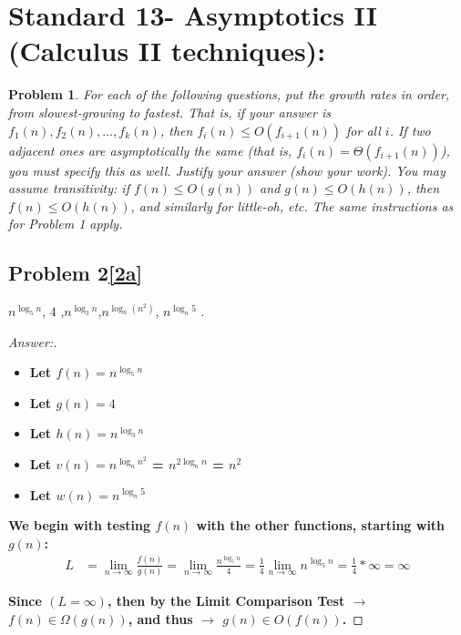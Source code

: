\documentclass[11pt]{article}
\theoremstyle{definition}
\theoremstyle{definition}
\newtheorem{required}{Problem}
\theoremstyle{definition}
\begin{document}
\section{Standard 13- Asymptotics II (Calculus II techniques): }
\begin{required}



    {\itshape For each of the following questions, put the growth rates in order, from slowest-growing to fastest. That is, if your answer is $f_1(n), f_2(n), \dotsc, f_k(n)$, then $f_i(n) \leq O(f_{i+1}(n))$ for all $i$. If two adjacent ones are asymptotically the same (that is, $f_i(n) = \Theta(f_{i+1}(n))$), you must specify this as well. 
    Justify your answer (show your work). You may assume transitivity: if $f(n) \leq O(g(n))$ and $g(n) \leq O(h(n))$, then $f(n) \leq O(h(n))$, and similarly for little-oh, etc. The same instructions as for Problem 1 apply.}
    \begin{enumerate}[label=(\alph*)]
\subsection{Problem 2\ref{2a}}
        \item \label{2a} $n^{\log_5 n}$, \qquad $4$ ,\qquad $n^{\log_3 n}$,\qquad  $n^{\log_n(n^2)}$, \qquad $ n^{\log_n 5}$ .
        \begin{proof}[Answer:] \

\begin{itemize}
\item \textbf{Let $f(n) = n^{\log_5 n}$}
\item \textbf{Let $g(n) = 4$}
\item \textbf{Let $h(n) = n^{\log_3 n}$}
\item \textbf{Let $v(n) = n^{\log_n n^2}$ = $n^{2\log_n n}$ = $n^2$}
\item \textbf{Let $w(n) = n^{\log_n 5}$}
\end{itemize}

\item \textbf{We begin with testing $f(n)$ with the other functions, starting with $g(n)$:}
\begin{align*}
L &= \lim_{n \to \infty} \frac{f(n)}{g(n)} = \lim_{n \to \infty} \frac{n^{\log_5 n}}{4} = \frac{1}{4} \lim_{n \to \infty} n^{\log_5 n} =  \frac{1}{4} * \infty = \infty
\end{align*}
\item \textbf{Since $(L = \infty)$, then by the Limit Comparison Test $\to$ $f(n) \in \Omega(g(n))$, and thus $\to$ $g(n) \in O(f(n))$.}


\end{proof}
\end{enumerate}
\end{required}
\end{document}
